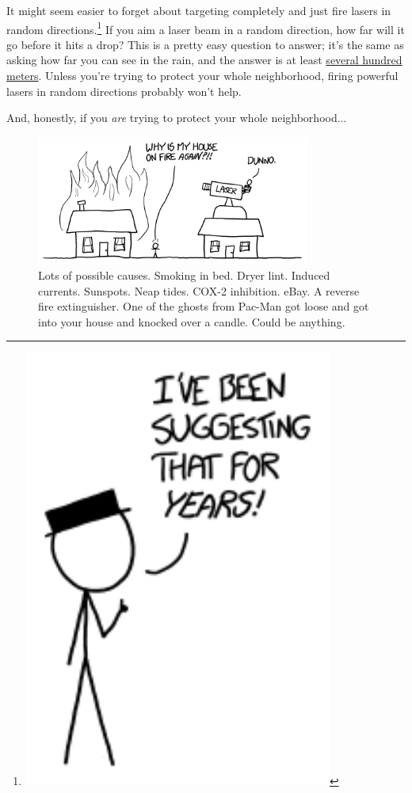 {{It might seem easier to forget about targeting completely and just fire lasers in random directions.{\footnote{
\includegraphics[scale=0.5, max width=0.8\textwidth]{imgs/a/119/years.png}
} } If you aim a laser beam in a random direction, how far will it go before it hits a drop? This is a pretty easy question to answer; it's the same as asking how far you can see in the rain, and the answer is at least \href{http://www.researchgate.net/publication/258316669\_Review\_of\_the\_mechanisms\_of\_visibility\_reduction\_by\_rain\_and\_wet\_road/links/00b7d527b4f9da2560000000}{several hundred meters}. Unless you're trying to protect your whole neighborhood, firing powerful lasers in random directions probably won't help.}

{And, honestly, if you \emph{are} trying to protect your whole neighborhood...}

\begin{figure}[!htbp]
\centering
\includegraphics[scale=0.5, max width=0.8\textwidth]{imgs/a/119/lasers.png}
\caption{Lots of possible causes. Smoking in bed. Dryer lint. Induced currents. Sunspots. Neap tides. COX-2 inhibition. eBay. A reverse fire extinguisher. One of the ghosts from Pac-Man got loose and got into your house and knocked over a candle. Could be anything.}
\end{figure}

}
